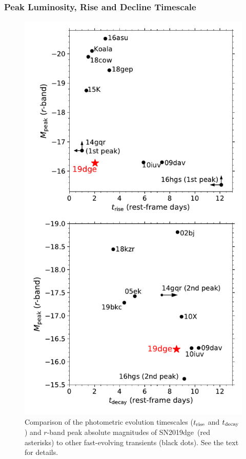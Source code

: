 \documentclass[twocolumn]{aastex63}
\newcommand{\name}{SN2019dge}
\begin{document}
\subsubsection{Peak Luminosity, Rise and Decline Timescale}\label{subsubsec:compare_mag}

\begin{figure}[htbp!]
	\centering
	\includegraphics[width=\columnwidth]{figures/compare_mag.pdf}
	\caption{Comparison of the photometric evolution timescales ($t_{\rm rise}$ and $t_{\rm  
			decay}$) and $r$-band peak absolute magnitudes of \name\ (red asterisks) to other 
			fast-evolving transients (black dots). See the text for details.
		\label{fig:compare_mag}}
\end{figure}
\end{document}
